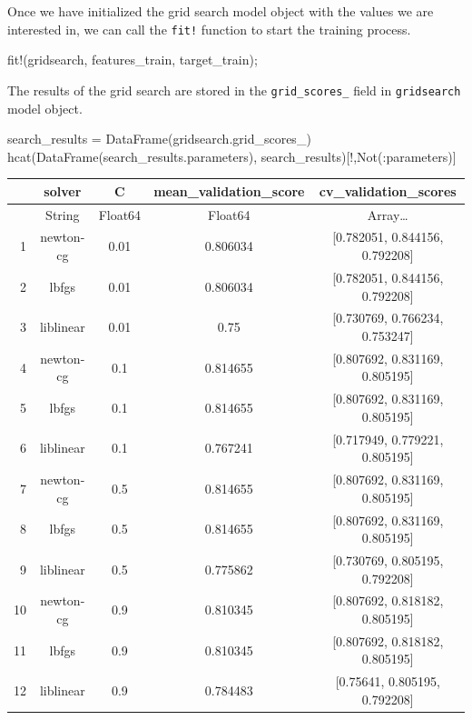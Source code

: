 \documentclass[
  letterpaper,
]{book}
\newenvironment{Shaded}{\begin{snugshade}}{\end{snugshade}}
\newcommand{\FunctionTok}[1]{\textcolor[rgb]{0.28,0.35,0.67}{#1}}
\newcommand{\NormalTok}[1]{\textcolor[rgb]{0.00,0.23,0.31}{#1}}
\newcommand{\OperatorTok}[1]{\textcolor[rgb]{0.37,0.37,0.37}{#1}}
\begin{document}
Once we have initialized the grid search model object with the values we
are interested in, we can call the \texttt{fit!} function to start the
training process.

\begin{Shaded}
\begin{Highlighting}[]
\FunctionTok{fit!}\NormalTok{(gridsearch, features\_train, target\_train); }
\end{Highlighting}
\end{Shaded}

The results of the grid search are stored in the \texttt{grid\_scores\_}
field in \texttt{gridsearch} model object.

\begin{Shaded}
\begin{Highlighting}[]
\NormalTok{search\_results }\OperatorTok{=} \FunctionTok{DataFrame}\NormalTok{(gridsearch.grid\_scores\_)}
\FunctionTok{hcat}\NormalTok{(}\FunctionTok{DataFrame}\NormalTok{(search\_results.parameters), }
\NormalTok{            search\_results)[!,}\FunctionTok{Not}\NormalTok{(}\OperatorTok{:}\NormalTok{parameters)]}
\end{Highlighting}
\end{Shaded}

\begin{tabular}{r|cccc}
    & solver & C & mean\_validation\_score & cv\_validation\_scores\\
    \hline
    & String & Float64 & Float64 & Array…\\
    \hline
    1 & newton-cg & 0.01 & 0.806034 & [0.782051, 0.844156, 0.792208] \\
    2 & lbfgs & 0.01 & 0.806034 & [0.782051, 0.844156, 0.792208] \\
    3 & liblinear & 0.01 & 0.75 & [0.730769, 0.766234, 0.753247] \\
    4 & newton-cg & 0.1 & 0.814655 & [0.807692, 0.831169, 0.805195] \\
    5 & lbfgs & 0.1 & 0.814655 & [0.807692, 0.831169, 0.805195] \\
    6 & liblinear & 0.1 & 0.767241 & [0.717949, 0.779221, 0.805195] \\
    7 & newton-cg & 0.5 & 0.814655 & [0.807692, 0.831169, 0.805195] \\
    8 & lbfgs & 0.5 & 0.814655 & [0.807692, 0.831169, 0.805195] \\
    9 & liblinear & 0.5 & 0.775862 & [0.730769, 0.805195, 0.792208] \\
    10 & newton-cg & 0.9 & 0.810345 & [0.807692, 0.818182, 0.805195] \\
    11 & lbfgs & 0.9 & 0.810345 & [0.807692, 0.818182, 0.805195] \\
    12 & liblinear & 0.9 & 0.784483 & [0.75641, 0.805195, 0.792208] \\
\end{tabular}
\end{document}
